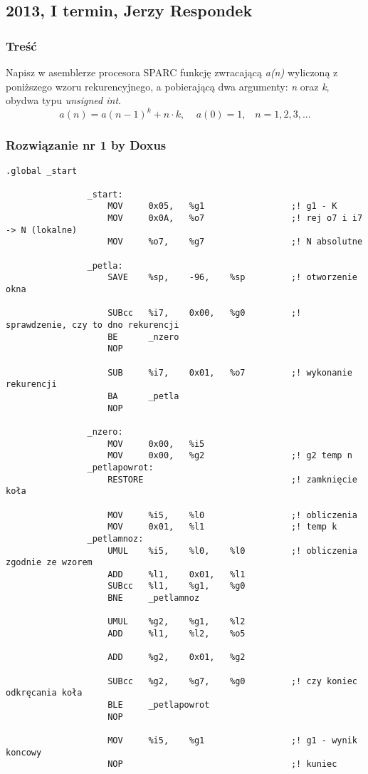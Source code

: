 	\newpage
	\subsection{2013, I termin, Jerzy Respondek}
		\subsubsection{Treść}
			Napisz w asemblerze procesora SPARC funkcję zwracającą \emph{a(n)} wyliczoną z poniższego wzoru rekurencyjnego, a pobierającą dwa argumenty: \emph{n} oraz \emph{k}, obydwa typu \textit{unsigned int}.
			$$ a(n)=a(n-1)^k+n\cdot k,\;\;\;\;a(0)=1,\;\;\;n=1,2,3,... $$
		\subsubsection{Rozwiązanie nr 1 by Doxus}
			\begin{lstlisting}[language={[sparc]Assembler}]
				.global _start
				
				_start:
					MOV		0x05,	%g1					;! g1 - K
					MOV		0x0A,	%o7					;! rej o7 i i7 -> N (lokalne)
					MOV		%o7,	%g7					;! N absolutne
				
				_petla:
					SAVE	%sp,	-96,	%sp			;! otworzenie okna
				
					SUBcc	%i7,	0x00,	%g0			;! sprawdzenie, czy to dno rekurencji
					BE		_nzero
					NOP
					
					SUB		%i7,	0x01,	%o7			;! wykonanie rekurencji
					BA		_petla
					NOP
					
				_nzero:
					MOV		0x00,	%i5
					MOV		0x00,	%g2					;! g2 temp n
				_petlapowrot:
					RESTORE								;! zamknięcie koła
					
					MOV		%i5,	%l0					;! obliczenia
					MOV		0x01,	%l1					;! temp k
				_petlamnoz:
					UMUL	%i5,	%l0,	%l0			;! obliczenia zgodnie ze wzorem
					ADD		%l1,	0x01,	%l1
					SUBcc	%l1,	%g1,	%g0
					BNE		_petlamnoz
					
					UMUL	%g2,	%g1,	%l2
					ADD		%l1,	%l2,	%o5
				
					ADD		%g2,	0x01,	%g2
					
					SUBcc	%g2,	%g7,	%g0			;! czy koniec odkręcania koła
					BLE		_petlapowrot
					NOP
				
					MOV		%i5,	%g1					;! g1 - wynik koncowy
					NOP									;! kuniec
			\end{lstlisting}
